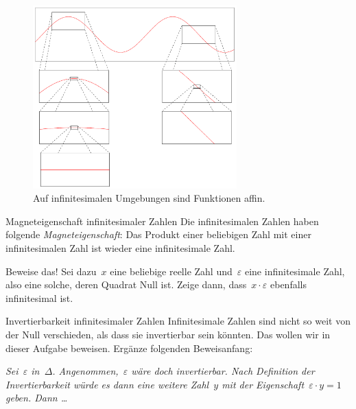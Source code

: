 \documentclass[twoside]{../zirkelblatt}
\theoremstyle{definition}
\theoremstyle{plain}
\theoremstyle{remark}
\begin{document}
\begin{figure}[H]
  \centering
  \includegraphics[width=0.7\textwidth]{mikroaffinitaet}
  \caption{\label{fig:mikroaffinitaet}Auf infinitesimalen Umgebungen sind Funktionen affin.}
\end{figure}

\begin{aufgabeShaded}{Magneteigenschaft infinitesimaler Zahlen}
Die infinitesimalen Zahlen haben folgende \emph{Magneteigenschaft}: Das Produkt
einer beliebigen Zahl mit einer infinitesimalen Zahl ist wieder eine
infinitesimale Zahl.

Beweise das! Sei dazu~$x$ eine beliebige reelle Zahl und~$\varepsilon$ eine
infinitesimale Zahl, also eine solche, deren Quadrat Null ist. Zeige dann,
dass~$x \cdot \varepsilon$ ebenfalls infinitesimal ist.
\end{aufgabeShaded}

\begin{aufgabeShaded}{Invertierbarkeit infinitesimaler Zahlen}
\label{aufg:invertierbarkeit}
Infinitesimale Zahlen sind nicht so weit von der Null verschieden, als dass sie
invertierbar sein könnten. Das wollen wir in dieser Aufgabe beweisen. Ergänze
folgenden Beweisanfang:

\emph{Sei~$\varepsilon$ in~$\Delta$. Angenommen,~$\varepsilon$ wäre
doch invertierbar. Nach Definition der Invertierbarkeit würde es dann eine weitere
Zahl~$y$ mit der Eigenschaft~$\varepsilon \cdot y = 1$ geben. Dann \ldots}
\end{aufgabeShaded}
\end{document}

